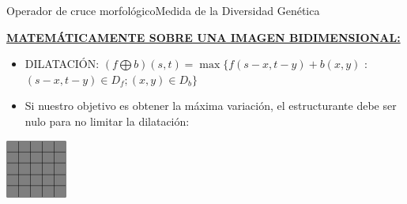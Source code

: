 \documentclass[10pt]{beamer}
\begin{document}
	\begin{frame}{Operador de cruce morfol\'ogico}{Medida de la Diversidad Gen\'etica}
		\begin{center}
			\underline{\textbf{MATEM\'ATICAMENTE SOBRE UNA IMAGEN BIDIMENSIONAL:}}\\
			\begin{itemize}
				\item DILATACI\'ON: $(f \bigoplus b)(s,t) = \max \{f(s-x, t-y)+b(x,y)$ : $(s-x, t-y) \in D_{f} ; (x,y) \in D_{b} \} $
			\end{itemize}
			
				
				\begin{itemize}
					\item Si nuestro objetivo es obtener la m\'axima variaci\'on, el estructurante debe ser nulo para no limitar la dilataci\'on:
				\end{itemize}
				
				\includegraphics[width = 2cm]{matriz_dilatada_sin_estructurante} 
				
			\end{center}
		\end{frame}
		
\end{document}
